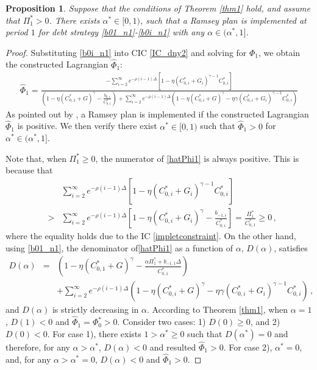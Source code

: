 \documentclass[12pt]{article}
\newtheorem{proposition}{Proposition}
\begin{document}
\begin{proposition}
Suppose that the conditions of Theorem \ref{thm1} hold, and assume that $\Pi_1^*> 0$. There exists $\alpha^*\in[0, 1)$, such that a Ramsey plan is implemented at period $1$ for debt strategy \eqref{b01_n1}-\eqref{b0i_n1} with any $\alpha\in (\alpha^*, 1]$.
\end{proposition}

\begin{proof}

Substituting \eqref{b0i_n1} into  CIC \eqref{IC_dny2} and solving for $\Phi_1$, we obtain the constructed Lagrangian $\widehat{\Phi}_1$:
	\begin{align}\label{hatPhi11}
	\widehat{\Phi}_1 = \frac{  - \sum_{i=2}^\infty e^{-\rho (i-1)\Delta}\left[ 1-\eta \left( C_{0, i}^* + G_i  \right)^{\gamma-1}C_{0, i}^*\right]      }{ \left(1-\eta(C_{0, 1}^*+G)^\gamma-\frac{b_{0, 1}}{C_{0, 1}^*}\right)+\sum_{i=2}^\infty e^{-\rho (i-1)\Delta}\left( 1-\eta(C_{0, i}^*+G)^\gamma  -\eta \gamma \left( C_{0, i}^* + G_i  \right)^{\gamma-1}C_{0, i}^*  \right)   }
	\end{align}
	As pointed out by \cite{debortoli2021optimal}, a Ramsey plan is implemented if the constructed Lagrangian  $\widehat{\Phi}_1$ is positive. We then verify there exist $\alpha^*\in[0, 1)$ such that $\widehat \Phi_1>0$ for $\alpha^*\in (\alpha^*, 1] $.
	
	Note that, when $\Pi_1^*\geq 0$, the numerator of \eqref{hatPhi1} is always positive. This is because that
	\begin{eqnarray*}
		& & \sum_{i=2}^\infty e^{-\rho (i-1)\Delta}\left[ 1-\eta \left( C_{0, i}^* + G_i  \right)^{\gamma-1}C_{0, i}^*\right] \\
		& >  &   \sum_{i=2}^\infty e^{-\rho (i-1)\Delta}\left[ 1-\eta \left( C_{0, i}^* + G_i  \right)^{\gamma}-\frac{b_{-1, i}}{C_{0, i}^*}\right] = \frac{\Pi_1^*}{C_{0, 1}^*}\geq 0 \,,
	\end{eqnarray*}
	where the equality holds due to the IC \eqref{impletconstraint}. On the other hand, using \eqref{b01_n1}, the denominator of\eqref{hatPhi1} as a function of $\alpha$, $D(\alpha)$, satisfies
	\begin{eqnarray*}
		D(\alpha)  & = &   \left(1-\eta(C_{0, 1}^*+G)^\gamma-\frac{\alpha \Pi_1^*+b_{-1, 1}\Delta}{C_{0, 1}^*}\right) \\
		& & +\sum_{i=2}^\infty e^{-\rho (i-1)\Delta}\left( 1-\eta(C_{0, i}^*+G)^\gamma  -\eta \gamma \left( C_{0, i}^* + G_i  \right)^{\gamma-1}C_{0, i}^*  \right)   \,,
	\end{eqnarray*}
	and $D(\alpha)$ is strictly decreasing in $\alpha$. 	According to Theorem \ref{thm1}, when $\alpha = 1$, $D(1)<0$ and $\widehat \Phi_1 =\Phi_0^*>0$. Consider two cases: 1) $D(0)\geq 0$, and 2) $D(0)<0$. For case 1), there exists $1>\alpha^*\geq 0$ such that $D(\alpha^*)=0$ and therefore, for any $\alpha> \alpha^*$, $D(\alpha)<0$  and resulted $\widehat \Phi_1>0$. For case 2), $\alpha^* =0$, and, for any $\alpha> \alpha^*=0$, $D(\alpha)<0$  and $\widehat \Phi_1>0$.
\end{proof}
\end{document}
